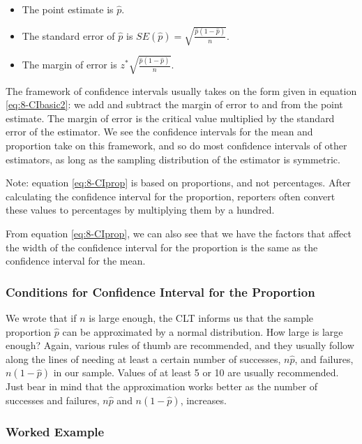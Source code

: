 \documentclass[
]{book}
\providecommand{\tightlist}{%
  \setlength{\itemsep}{0pt}\setlength{\parskip}{0pt}}
\begin{document}
\begin{itemize}
\tightlist
\item
  The point estimate is \(\hat{p}\).
\item
  The standard error of \(\hat{p}\) is \(SE(\hat{p}) = \sqrt{\frac{\hat{p}(1-\hat{p})}{n}}\).
\item
  The margin of error is \(z^{*} \sqrt{\frac{\hat{p}(1-\hat{p})}{n}}\).
\end{itemize}

The framework of confidence intervals usually takes on the form given in equation \eqref{eq:8-CIbasic2}: we add and subtract the margin of error to and from the point estimate. The margin of error is the critical value multiplied by the standard error of the estimator. We see the confidence intervals for the mean and proportion take on this framework, and so do most confidence intervals of other estimators, as long as the sampling distribution of the estimator is symmetric.

Note: equation \eqref{eq:8-CIprop} is based on proportions, and not percentages. After calculating the confidence interval for the proportion, reporters often convert these values to percentages by multiplying them by a hundred.

From equation \eqref{eq:8-CIprop}, we can also see that we have the factors that affect the width of the confidence interval for the proportion is the same as the confidence interval for the mean.

\subsubsection{Conditions for Confidence Interval for the Proportion}\label{conditions-for-confidence-interval-for-the-proportion}

We wrote that if \(n\) is large enough, the CLT informs us that the sample proportion \(\hat{p}\) can be approximated by a normal distribution. How large is large enough? Again, various rules of thumb are recommended, and they usually follow along the lines of needing at least a certain number of successes, \(n\hat{p}\), and failures, \(n(1-\hat{p})\) in our sample. Values of at least 5 or 10 are usually recommended. Just bear in mind that the approximation works better as the number of successes and failures, \(n\hat{p}\) and \(n(1-\hat{p})\), increases.

\subsubsection{Worked Example}\label{worked-example-3}
\end{document}
